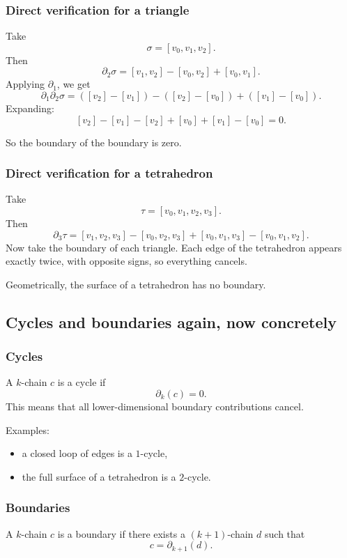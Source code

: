 \documentclass[12pt,a4paper]{article}
\theoremstyle{notespace}
\begin{document}
\subsubsection{Direct verification for a triangle}

Take
\[
\sigma=[v_0,v_1,v_2].
\]
Then
\[
\partial_2\sigma
=
[v_1,v_2]-[v_0,v_2]+[v_0,v_1].
\]
Applying \(\partial_1\), we get
\[
\partial_1\partial_2\sigma
=
([v_2]-[v_1]) - ([v_2]-[v_0]) + ([v_1]-[v_0]).
\]
Expanding:
\[
[v_2]-[v_1]-[v_2]+[v_0]+[v_1]-[v_0]=0.
\]

So the boundary of the boundary is zero.

\subsubsection{Direct verification for a tetrahedron}

Take
\[
\tau=[v_0,v_1,v_2,v_3].
\]
Then
\[
\partial_3\tau
=
[v_1,v_2,v_3]
-
[v_0,v_2,v_3]
+
[v_0,v_1,v_3]
-
[v_0,v_1,v_2].
\]
Now take the boundary of each triangle. Each edge of the tetrahedron appears exactly twice, with opposite signs, so everything cancels.

Geometrically, the surface of a tetrahedron has no boundary.

\subsection{Cycles and boundaries again, now concretely}

\subsubsection{Cycles}

A \(k\)-chain \(c\) is a cycle if
\[
\partial_k(c)=0.
\]
This means that all lower-dimensional boundary contributions cancel.

Examples:
\begin{itemize}
	\item a closed loop of edges is a \(1\)-cycle,
	\item the full surface of a tetrahedron is a \(2\)-cycle.
\end{itemize}

\subsubsection{Boundaries}

A \(k\)-chain \(c\) is a boundary if there exists a \((k+1)\)-chain \(d\) such that
\[
c=\partial_{k+1}(d).
\]
\end{document}
